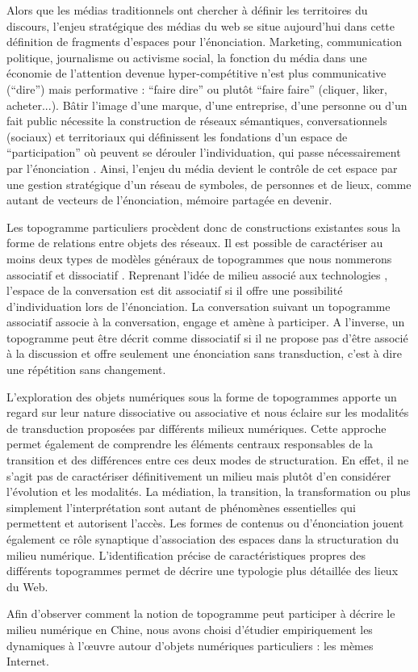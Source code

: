 Alors que les médias traditionnels ont chercher à définir les territoires du discours, l’enjeu stratégique des médias du web se situe aujourd’hui dans cette définition de fragments d’espaces pour l’énonciation. Marketing, communication politique, journalisme ou activisme social, la fonction du média dans une économie de l’attention devenue hyper-compétitive \citep{Weng2012} n’est plus communicative (``dire'') mais performative : ``faire dire'' ou plutôt ``faire faire'' (cliquer, liker, acheter...). Bâtir l’image d’une marque, d’une entreprise, d’une personne ou d’un fait public nécessite la construction de réseaux sémantiques, conversationnels (sociaux) et territoriaux qui définissent les fondations d’un espace de ``participation'' où peuvent se dérouler l’individuation, qui passe nécessairement par l’énonciation \citep{Butler1993}. Ainsi, l’enjeu du média devient le contrôle de cet espace par une gestion stratégique d’un réseau de symboles, de personnes et de lieux, comme autant de vecteurs de l’énonciation, mémoire partagée en devenir. 

Les topogramme particuliers procèdent donc de constructions existantes sous la forme de relations entre objets des réseaux. Il est possible de caractériser au moins deux types de modèles généraux de topogrammes que nous nommerons associatif et dissociatif \citep{Stiegler2008}. Reprenant l’idée de milieu associé aux technologies \citep{Simondon1989}, l’espace de la conversation est dit associatif si il offre une possibilité d’individuation lors de l’énonciation. La conversation suivant un topogramme associatif associe à la conversation, engage et amène à participer. A l’inverse, un topogramme peut être décrit comme dissociatif si il ne propose pas d’être associé à la discussion et offre seulement une énonciation sans transduction, c’est à dire une répétition sans changement.

L’exploration des objets numériques sous la forme de topogrammes apporte un regard sur leur nature dissociative ou associative et nous éclaire sur les modalités de transduction proposées par différents milieux numériques. Cette approche permet également de comprendre les éléments centraux responsables de la transition et des différences entre ces deux modes de structuration. En effet, il ne s’agit pas de caractériser définitivement un milieu mais plutôt d’en considérer l’évolution et les modalités. La médiation, la transition, la transformation ou plus simplement l’interprétation sont autant de phénomènes essentielles qui permettent et autorisent l’accès. Les formes de contenus ou d’énonciation jouent également ce rôle synaptique d’association des espaces dans la structuration du milieu numérique. L’identification précise de caractéristiques propres des différents topogrammes permet de décrire une typologie plus détaillée des lieux du Web. 

Afin d’observer comment la notion de topogramme peut participer à décrire le milieu numérique en Chine, nous avons choisi d’étudier empiriquement les dynamiques à l’œuvre autour d'objets numériques particuliers : les mèmes Internet. 
